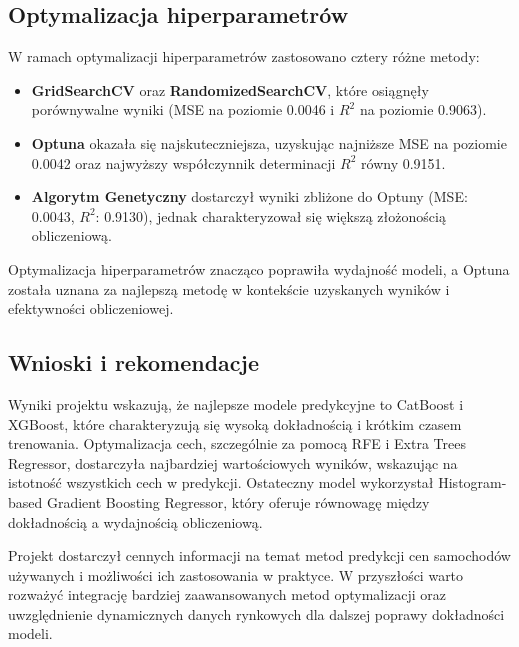 \documentclass[10pt,letterpaper]{article}
\begin{document}
	\subsection*{Optymalizacja hiperparametrów}
	W ramach optymalizacji hiperparametrów zastosowano cztery różne metody:
	\begin{itemize}
		\item \textbf{GridSearchCV} oraz \textbf{RandomizedSearchCV}, które osiągnęły porównywalne wyniki (MSE na poziomie 0.0046 i $R^2$ na poziomie 0.9063).
		\item \textbf{Optuna} okazała się najskuteczniejsza, uzyskując najniższe MSE na poziomie 0.0042 oraz najwyższy współczynnik determinacji $R^2$ równy 0.9151.
		\item \textbf{Algorytm Genetyczny} dostarczył wyniki zbliżone do Optuny (MSE: 0.0043, $R^2$: 0.9130), jednak charakteryzował się większą złożonością obliczeniową.
	\end{itemize}
	Optymalizacja hiperparametrów znacząco poprawiła wydajność modeli, a Optuna została uznana za najlepszą metodę w kontekście uzyskanych wyników i efektywności obliczeniowej.
	
	\subsection*{Wnioski i rekomendacje}
	Wyniki projektu wskazują, że najlepsze modele predykcyjne to CatBoost i XGBoost, które charakteryzują się wysoką dokładnością i krótkim czasem trenowania. Optymalizacja cech, szczególnie za pomocą RFE i Extra Trees Regressor, dostarczyła najbardziej wartościowych wyników, wskazując na istotność wszystkich cech w predykcji. Ostateczny model wykorzystał Histogram-based Gradient Boosting Regressor, który oferuje równowagę między dokładnością a wydajnością obliczeniową.
	
	Projekt dostarczył cennych informacji na temat metod predykcji cen samochodów używanych i możliwości ich zastosowania w praktyce. W przyszłości warto rozważyć integrację bardziej zaawansowanych metod optymalizacji oraz uwzględnienie dynamicznych danych rynkowych dla dalszej poprawy dokładności modeli.


 
\end{document}
